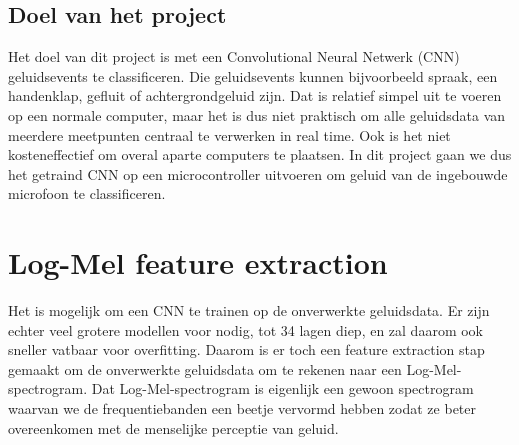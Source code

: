 \subsection{Doel van het project}

Het doel van dit project is met een Convolutional Neural Netwerk (CNN) geluidsevents te classificeren.
Die geluidsevents kunnen bijvoorbeeld spraak, een handenklap, gefluit of achtergrondgeluid zijn.
Dat is relatief simpel uit te voeren op een normale computer, maar het is dus niet praktisch om alle geluidsdata van meerdere meetpunten centraal te verwerken in real time.
Ook is het niet kosteneffectief om overal aparte computers te plaatsen. In dit project gaan we dus het getraind CNN op een microcontroller uitvoeren om geluid van de ingebouwde microfoon te classificeren.

\section{Log-Mel feature extraction}

Het is mogelijk om een CNN te trainen op de onverwerkte geluidsdata.
Er zijn echter veel grotere modellen voor nodig, tot 34 lagen diep, en zal daarom ook sneller vatbaar voor overfitting. \cite{IEEE:very-deep-cnn-raw-waveforms}
Daarom is er toch een feature extraction stap gemaakt om de onverwerkte geluidsdata om te rekenen naar een Log-Mel-spectrogram.
Dat Log-Mel-spectrogram is eigenlijk een gewoon spectrogram waarvan we de frequentiebanden een beetje vervormd hebben zodat ze beter overeenkomen met de menselijke perceptie van geluid. \cite{enwiki:Mel-freq-cepstrum}


